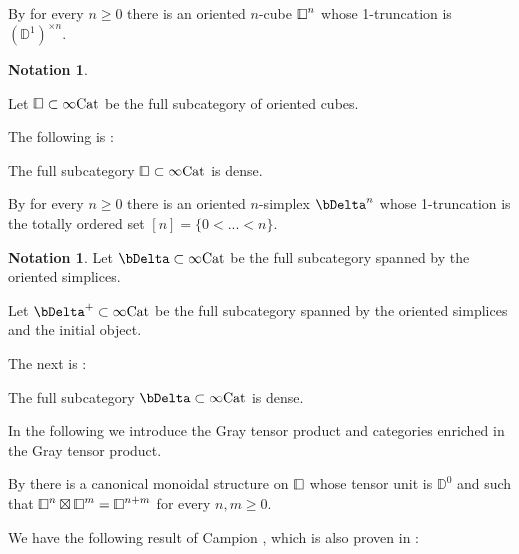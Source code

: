 \documentclass[10pt,oneside]{article}
\numberwithin{equation}{section} %
\numberwithin{figure}{section} %
\theoremstyle{plain}
\theoremstyle{definition}
\newtheorem{notation}[thm]{Notation}
\newcommand{\bD}{{\mathbb D}}
\newcommand{\Cat}{\mathrm{Cat}}
\newcommand{\cube}{{\,\vline\negmedspace\square}}
\begin{document}
By \cite[Definition 2.6.25]{GepnerHeine2026} for every $n \geq 0$ there is an oriented $n$-cube $\cube^n$
whose 1-truncation is $(\bD^1)^{\times n}.$



\begin{notation}\label{sqGray}

Let $\cube \subset \infty\Cat$ be the full subcategory of oriented cubes.
\end{notation}

The following is \cite[Theorem 2.8.12]{GepnerHeine2026}:

\begin{theorem}\label{cubedense}

The full subcategory $\cube \subset \infty\Cat$ is dense.
    
\end{theorem}

By \cite[Definition 2.6.32]{GepnerHeine2026} for every $n \geq 0$ there is an oriented $n$-simplex $\bDelta^n$
whose 1-truncation is the totally ordered set $[n]= \{0 < ...< n \}.$

\begin{notation}

Let $\bDelta \subset\infty\Cat$ be the full subcategory spanned by the oriented simplices.
  
Let $\bDelta^+ \subset\infty\Cat$ be the full subcategory spanned by the oriented simplices and the initial object.
  
\end{notation}

The next is \cite[Theorem 2.7.8]{GepnerHeine2026}:

\begin{theorem}\label{orientdense}

The full subcategory $\bDelta\subset\infty\Cat$ is dense.
    
\end{theorem}


In the following we introduce the Gray tensor product
and categories enriched in the Gray tensor product.



By \cite[Definition 2.6.23]{GepnerHeine2026} there is a canonical monoidal structure on $\cube$ whose tensor unit is
$\bD^0$ and such that $\cube^n \boxtimes \cube^m= \cube^{n+m}$ for every $n,m \geq 0.$



We have the following result of Campion \cite{campion2022cubesdenseinftyinftycategories}, which is also proven in \cite[Corollary 3.4.2]{GepnerHeine2026}:
\end{document}
